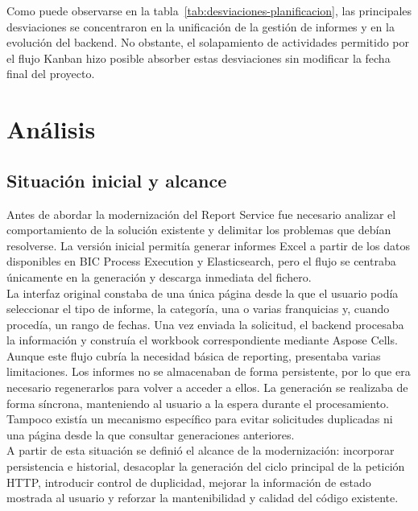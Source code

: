 \documentclass[11pt,a4paper,titlepage,oneside]{report}
\begin{document}
Como puede observarse en la tabla~\ref{tab:desviaciones-planificacion}, las
principales desviaciones se concentraron en la unificación de la gestión de
informes y en la evolución del backend. No obstante, el solapamiento de
actividades permitido por el flujo Kanban hizo posible absorber estas
desviaciones sin modificar la fecha final del proyecto.\\


\chapter{Análisis}
\label{chap:analisis}

\section{Situación inicial y alcance}

Antes de abordar la modernización del Report Service fue necesario analizar el
comportamiento de la solución existente y delimitar los problemas que debían
resolverse. La versión inicial permitía generar informes Excel a partir de los
datos disponibles en BIC Process Execution y Elasticsearch, pero el flujo se
centraba únicamente en la generación y descarga inmediata del fichero. \\

La interfaz original constaba de una única página desde la que el usuario podía
seleccionar el tipo de informe, la categoría, una o varias franquicias y, cuando
procedía, un rango de fechas. Una vez enviada la solicitud, el backend procesaba
la información y construía el workbook correspondiente mediante Aspose Cells. \\

Aunque este flujo cubría la necesidad básica de reporting, presentaba varias
limitaciones. Los informes no se almacenaban de forma persistente, por lo que
era necesario regenerarlos para volver a acceder a ellos. La generación se
realizaba de forma síncrona, manteniendo al usuario a la espera durante el
procesamiento. Tampoco existía un mecanismo específico para evitar solicitudes
duplicadas ni una página desde la que consultar generaciones anteriores. \\

A partir de esta situación se definió el alcance de la modernización: incorporar
persistencia e historial, desacoplar la generación del ciclo principal de la
petición HTTP, introducir control de duplicidad, mejorar la información de
estado mostrada al usuario y reforzar la mantenibilidad y calidad del código
existente. \\
\end{document}
